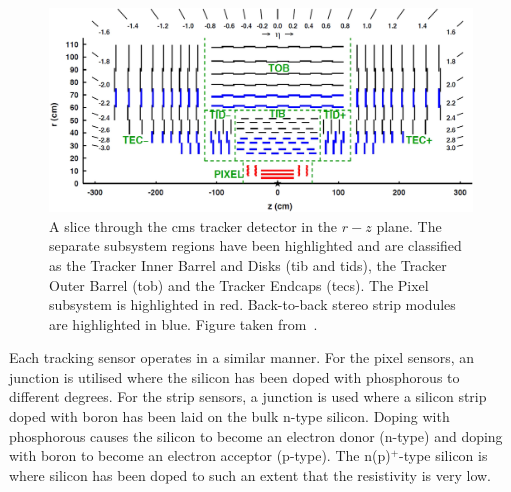 \begin{figure}[htpb]
	\centering
	\includegraphics[width=\textwidth]{Figures/CMSTracker2.jpg}
	\caption[A slice through the \acrshort{cms} tracker detector in the $r-z$ plane. The separate subsystem regions have been highlighted and are classified as the Tracker Inner Barrel and Disks (\acrshort{tib} and \acrshort{tid}s), the Tracker Outer Barrel (\acrshort{tob}) and the Tracker Endcaps (\acrshort{tec}s). The Pixel subsystem is highlighted in red. Back-to-back stereo strip modules are highlighted in blue.]{A slice through the \acrshort{cms} tracker detector in the $r-z$ plane. The separate subsystem regions have been highlighted and are classified as the Tracker Inner Barrel and Disks (\acrshort{tib} and \acrshort{tid}s), the Tracker Outer Barrel (\acrshort{tob}) and the Tracker Endcaps (\acrshort{tec}s). The Pixel subsystem is highlighted in red. Back-to-back stereo strip modules are highlighted in blue. Figure taken from~\cite{CMSTrackerPerformance}.}
	\label{fig:CMSTracker}
\end{figure}

Each tracking sensor operates in a similar manner.
For the pixel sensors, an \nnjunc{} junction is utilised where the silicon has been doped with phosphorous to different degrees. 
For the strip sensors, a \pnjunc{} junction is used where a silicon strip doped with boron has been laid on the bulk n-type silicon.
Doping with phosphorous causes the silicon to become an electron donor (n-type) and doping with boron to become an electron acceptor (p-type).
The n(p)$^{+}$-type silicon is where silicon has been doped to such an extent that the resistivity is very low.%

